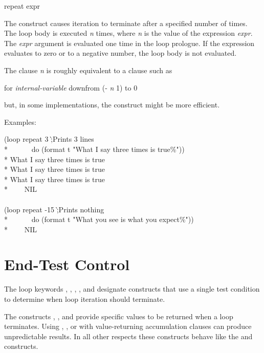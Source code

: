\begin{defloop}
repeat expr

The  construct causes iteration to terminate after a
specified number of times.
The loop body is executed {\it n} times, where {\it n} is the value 
of the expression {\it expr}.  The {\it expr} argument is evaluated one time
in the loop prologue.  If the expression evaluates to zero or 
to a negative number, the loop body is not evaluated.


  The clause  {\it n} is roughly equivalent to a clause
  such as 
\begin{lisp}
for {\it internal-variable} downfrom (- {\it n} 1) to 0
\end{lisp}
but, in some implementations, the  construct might 
   be more efficient.


Examples:
\begin{lisp}
(loop repeat 3 \`;{\rm Prints 3 lines}\\*
~~~~~~do (format t "What I say three times is true{\Xtilde}\%")) \\*
What I say three times is true \\*
What I say three times is true \\*
What I say three times is true \\*
~~~\EV~NIL \\
 \\
(loop repeat -15 \`;{\rm Prints nothing}\\*
~~~~~~do (format t "What you see is what you expect{\Xtilde}\%")) \\*
~~~\EV~NIL
\end{lisp}
\end{defloop}



\section{End-Test Control}
\label{LOOP-TEST-SECTION}

The loop keywords , , ,
, and  designate constructs that use a single test 
condition to determine when loop iteration should terminate.

The constructs , , and  provide
specific values to be returned when a loop terminates.  
Using , , or  with 
value-returning accumulation clauses can produce unpredictable results.
In all other respects these
constructs behave like the  and  constructs.

